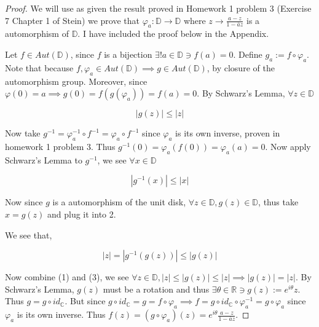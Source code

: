 \documentclass{article}
\newcommand{\C}{\mathbb{C}}
\newcommand{\R}{\mathbb{R}}
\newcommand{\abs}[1]{\left\lvert #1\right\rvert}
\begin{document}
\begin{proof}
    We will use as given the result proved in Homework 1 problem 3 (Exercise 7 Chapter 1 of Stein) we prove that $\varphi_a : \mathbb{D} \to \mathbb{D}$ where $z \to \frac{a - z}{1 - \bar{a} z}$ is a automorphism of $\mathbb{D}$. I have included the proof below in the Appendix. 
    
    Let $f \in Aut(\mathbb{D})$, since $f$ is a bijection $\exists! a \in \mathbb{D} \ni f(a) = 0$. Define $g_a := f \circ \varphi_a$. Note that because $f, \varphi_a \in Aut(\mathbb{D}) \implies g \in Aut(\mathbb{D})$, by closure of the automorphism group. Moreover, since $\varphi(0) = a \implies g(0) = f(g(\varphi_a)) = f(a) = 0$. By Schwarz's Lemma, $\forall z\in \mathbb{D}$ 
    
    \begin{equation}
        \abs{g(z)} \leq \abs{z}
    \end{equation}

    Now take $g^{-1} = \varphi_a^{-1} \circ f^{-1} = \varphi_a \circ f^{-1}$ since $\varphi_a$ is its own inverse, proven in homework 1 problem 3. Thus $g^{-1}(0) = \varphi_a(f(0)) = \varphi_a(a) = 0$. Now apply Schwarz's Lemma to $g^{-1}$, we see $\forall x \in \mathbb{D}$ 
    
    \begin{equation}
        \abs{g^{-1}(x)} \leq \abs{x}
    \end{equation}

    Now since $g$ is a automorphism of the unit disk, $\forall z \in \mathbb{D}, g(z) \in \mathbb{D}$, thus take $x = g(z)$ and plug it into 2.
    
    We see that, 

    \begin{equation}
        \abs{z} = \abs{g^{-1}(g(z))} \leq \abs{g(z)}
    \end{equation} 

    Now combine (1) and (3), we see $\forall z \in \mathbb{D}, \abs{z} \leq \abs{g(z)} \leq \abs{z} \implies \abs{g(z)} = \abs{z}$. By Schwarz's Lemma, $g(z)$ must be a rotation and thus $\exists \theta \in \R \ni g(z) := e^{i \theta} z$. Thus $g = g \circ id_{\C}$. But since $g \circ id_{\C} = g = f \circ \varphi_a \implies f = g \circ id_\C \circ \varphi_a^{-1} = g \circ \varphi_a$ since $\varphi_a$ is its own inverse. Thus $f(z) = (g \circ \varphi_a)(z) = e^{i \theta} \frac{a -z}{1 - \overline{a} z}$.              
\end{proof}

\bigskip
\end{document}
